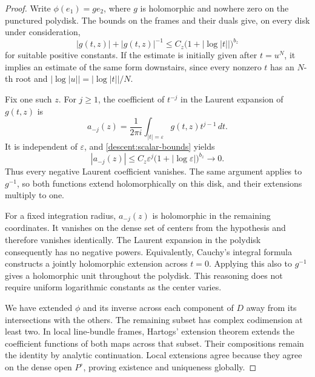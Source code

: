 \begin{proof}
Write \(\phi(e_1)=g e_2\), where \(g\) is holomorphic and
nowhere zero on the punctured polydisk.
The bounds on the frames and their duals give, on every disk under
consideration,
\begin{equation}
\label{descent:scalar-bounds}
 |g(t,z)|+|g(t,z)|^{-1}
 \leq C_z\bigl(1+|\log|t||\bigr)^{b_z}
\end{equation}
for suitable positive constants.
If the estimate is initially given after \(t=u^N\), it implies
an estimate of the same form downstairs, since every nonzero \(t\)
has an \(N\)-th root and
\(|\log|u||=|\log|t||/N\).

Fix one such \(z\).
For \(j\geq1\), the coefficient of \(t^{-j}\) in the Laurent
expansion of \(g(t,z)\) is
\[
 a_{-j}(z)=\frac{1}{2\pi i}
          \int_{|t|=\varepsilon}g(t,z)t^{j-1}\,dt.
\]
It is independent of \(\varepsilon\), and
\eqref{descent:scalar-bounds} yields
\[
 |a_{-j}(z)|
 \leq C_z\varepsilon^j
        \bigl(1+|\log\varepsilon|\bigr)^{b_z}
 \longrightarrow0.
\]
Thus every negative Laurent coefficient vanishes.
The same argument applies to \(g^{-1}\), so both functions extend
holomorphically on this disk, and their extensions multiply to one.

For a fixed integration radius, \(a_{-j}(z)\) is holomorphic in
the remaining coordinates.  It vanishes on the dense set of
centers from the hypothesis and therefore vanishes identically.
The Laurent expansion in the polydisk consequently has no negative
powers.  Equivalently, Cauchy's integral formula constructs a
jointly holomorphic extension across \(t=0\).
Applying this also to \(g^{-1}\) gives a holomorphic unit throughout
the polydisk.  This reasoning does not require uniform logarithmic
constants as the center varies.

We have extended \(\phi\) and its inverse across each component of
\(D\) away from its intersections with the others.
The remaining subset has complex codimension at least two.
In local line-bundle frames, Hartogs' extension theorem extends the
coefficient functions of both maps across that subset.
Their compositions remain the identity by analytic continuation.
Local extensions agree because they agree on the dense open
\(P^\circ\), proving existence and uniqueness globally.
\end{proof}

